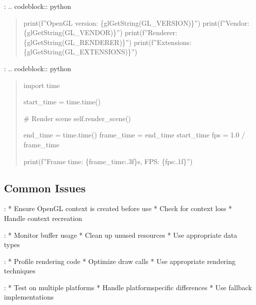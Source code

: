 \documentclass[a4paper,10pt,english,openany,oneside]{sphinxmanual}
\begin{document}
\sphinxAtStartPar
{}:
.. code\sphinxhyphen{}block:: python
\begin{quote}
\begin{description}
\sphinxAtStartPar
print(f”OpenGL version: \{glGetString(GL\_VERSION)\}”)
print(f”Vendor: \{glGetString(GL\_VENDOR)\}”)
print(f”Renderer: \{glGetString(GL\_RENDERER)\}”)
print(f”Extensions: \{glGetString(GL\_EXTENSIONS)\}”)

\end{description}
\end{quote}

\sphinxAtStartPar
{}:
.. code\sphinxhyphen{}block:: python
\begin{quote}

\sphinxAtStartPar
import time
\begin{description}
\sphinxAtStartPar
start\_time = time.time()

\sphinxAtStartPar
\# Render scene
self.render\_scene()

\sphinxAtStartPar
end\_time = time.time()
frame\_time = end\_time \sphinxhyphen{} start\_time
fps = 1.0 / frame\_time

\sphinxAtStartPar
print(f”Frame time: \{frame\_time:.3f\}s, FPS: \{fps:.1f\}”)

\end{description}
\end{quote}


\subsection{Common Issues}
\label{\detokenize{development:common-issues}}
\sphinxAtStartPar
{}:
* Ensure OpenGL context is created before use
* Check for context loss
* Handle context recreation

\sphinxAtStartPar
{}:
* Monitor buffer usage
* Clean up unused resources
* Use appropriate data types

\sphinxAtStartPar
{}:
* Profile rendering code
* Optimize draw calls
* Use appropriate rendering techniques

\sphinxAtStartPar
{}:
* Test on multiple platforms
* Handle platform\sphinxhyphen{}specific differences
* Use fallback implementations
\end{document}

